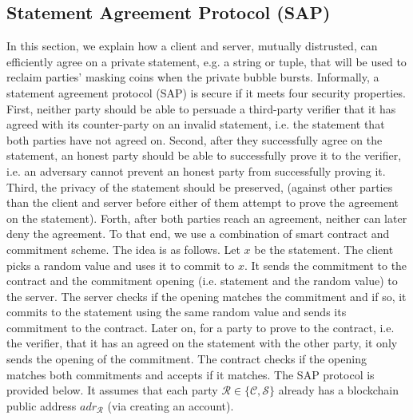
\subsection{Statement Agreement Protocol (SAP)}\label{SAP}



In this section, we explain how a client and server, mutually distrusted, can efficiently agree on a private statement, e.g.  a string or tuple, that will be used to reclaim parties' masking coins when the private bubble bursts. Informally, a statement agreement protocol (SAP) is secure if it meets four security properties. First, neither party should be able to persuade  a third-party  verifier that it has agreed with its counter-party on an invalid statement, i.e. the statement that both parties have not agreed on. Second, after they successfully agree on the statement,  an honest party should be able to successfully prove it to the verifier, i.e. an adversary cannot prevent an honest party from successfully proving it. Third, the privacy of the statement should be preserved, (against other parties than the client and server before either of them attempt to prove the agreement on the statement). Forth, after both parties reach an agreement, neither can later deny the agreement. To that end, we use a combination of smart contract and commitment scheme. The idea is as follows. Let $x$ be the statement. The client picks a random value and uses it to commit to $x$. It sends the commitment to the contract and the commitment opening (i.e. statement and the random value) to the server. The server checks if the opening matches the commitment and if so, it commits to the statement using the same random value and sends its commitment to the contract. Later on, for a party to prove to the contract, i.e. the verifier, that it has an agreed on the statement with the other party, it only sends the opening of the commitment.  The contract checks if the opening matches both commitments and accepts if it matches. The SAP protocol is provided below. It assumes that each party $\mathcal{R} \in\{\mathcal{C,S}\}$ already has a blockchain public address $adr_{\scriptscriptstyle\mathcal{R}}$ (via creating an account). 



